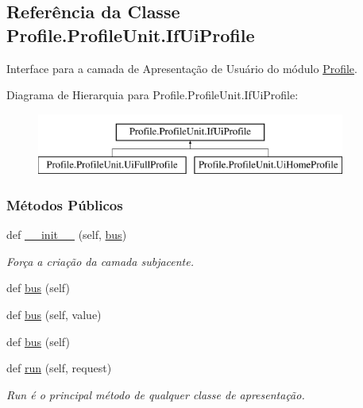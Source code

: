 \hypertarget{classProfile_1_1ProfileUnit_1_1IfUiProfile}{}\subsection{Referência da Classe Profile.\+Profile\+Unit.\+If\+Ui\+Profile}
\label{classProfile_1_1ProfileUnit_1_1IfUiProfile}


Interface para a camada de Apresentação de Usuário do módulo \hyperlink{namespaceProfile}{Profile}.  


Diagrama de Hierarquia para Profile.\+Profile\+Unit.\+If\+Ui\+Profile\+:\begin{figure}[H]
\begin{center}
\leavevmode
\includegraphics[height=2.000000cm]{dc/d25/classProfile_1_1ProfileUnit_1_1IfUiProfile}
\end{center}
\end{figure}
\subsubsection*{Métodos Públicos}
\begin{DoxyCompactItemize}
\item 
def \hyperlink{classProfile_1_1ProfileUnit_1_1IfUiProfile_a0ed40561bdc1a3af45a1093fd2205e27}{\+\_\+\+\_\+init\+\_\+\+\_\+} (self, \hyperlink{classProfile_1_1ProfileUnit_1_1IfUiProfile_a32a87d193e5d14e0ff3125d6bab2c420}{bus})
\begin{DoxyCompactList}\small\item\em Força a criação da camada subjacente. \end{DoxyCompactList}\item 
def \hyperlink{classProfile_1_1ProfileUnit_1_1IfUiProfile_a4d1251e277cd197a636d9fa2aa463ca6}{bus} (self)
\item 
def \hyperlink{classProfile_1_1ProfileUnit_1_1IfUiProfile_aa2bc24cbf26ac95284d3fea20e6bbc15}{bus} (self, value)
\item 
def \hyperlink{classProfile_1_1ProfileUnit_1_1IfUiProfile_a4d1251e277cd197a636d9fa2aa463ca6}{bus} (self)
\item 
def \hyperlink{classProfile_1_1ProfileUnit_1_1IfUiProfile_ace6afc2cf1a0ff9934ed13d4fbdf68c3}{run} (self, request)
\begin{DoxyCompactList}\small\item\em \textquotesingle{}Run\textquotesingle{} é o principal método de qualquer classe de apresentação. \end{DoxyCompactList}\end{DoxyCompactItemize}
